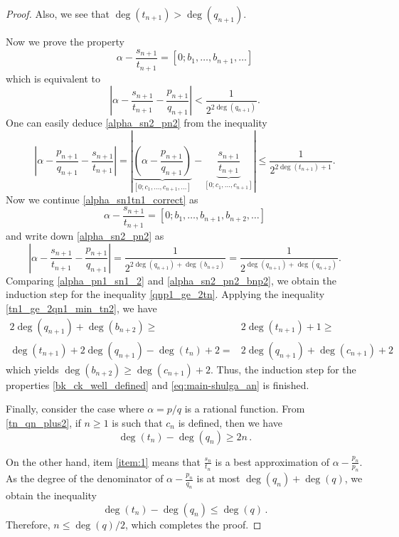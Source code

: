 \documentclass[a4paper,12pt]{article}
\begin{document}
\begin{proof}
{Also, we see that $\deg(t_{n+1})>\deg(q_{n+1})$.

Now we prove the property
\begin{equation}
\label{alpha_sn1tn1_correct}
\alpha-\frac{s_{n+1}}{t_{n+1}}=[0;b_1,\ldots,b_{n+1},\ldots]  
\end{equation}
which is equivalent to
\begin{equation}
\label{alpha_sn2_pn2}
\left|\alpha-\frac{s_{n+1}}{t_{n+1}}-\frac{p_{n+1}}{q_{n+1}}\right|<\frac{1}{2^{2\deg(q_{n+1})}}.
\end{equation}
One can easily deduce \eqref{alpha_sn2_pn2} from the inequality
\begin{equation}
\label{alpha_pn1_sn1_2}
\left|\alpha-\frac{p_{n+1}}{q_{n+1}}-\frac{s_{n+1}}{t_{n+1}}\right|=
\left|\underbrace{\left(\alpha-\frac{p_{n+1}}{q_{n+1}}\right)}_{[0;c_1,\ldots,c_{n+1},\ldots]}-\underbrace{\frac{s_{n+1}}{t_{n+1}}}_{[0;c_1,\ldots,c_{n+1}]}\right|\le\frac{1}{2^{2\deg(t_{n+1})+1}}.
\end{equation}
Now we continue \eqref{alpha_sn1tn1_correct} as 
\begin{equation}
\label{alpha_sn1tn1_correct_2}
\alpha-\frac{s_{n+1}}{t_{n+1}}=[0;b_1,\ldots,b_{n+1},b_{n+2},\ldots]  
\end{equation}
and write down \eqref{alpha_sn2_pn2} as 
\begin{equation}
\label{alpha_sn2_pn2_bnp2}
\left|\alpha-\frac{s_{n+1}}{t_{n+1}}-\frac{p_{n+1}}{q_{n+1}}\right|=\frac{1}{2^{2\deg(q_{n+1})+\deg(b_{n+2})}}=\frac{1}{2^{\deg(q_{n+1})+\deg(q_{n+2})}}. 
\end{equation}
Comparing \eqref{alpha_pn1_sn1_2} and \eqref{alpha_sn2_pn2_bnp2}, we obtain the induction step for the inequality \eqref{qnp1_ge_2tn}. 
Applying the inequality \eqref{tn1_ge_2qn1_min_tn2}, we have
\begin{align*}
2\deg(q_{n+1})+\deg(b_{n+2})\ge& 2\deg(t_{n+1})+1\ge\\ \deg(t_{n+1})+2\deg(q_{n+1})-\deg(t_n)+2=&2\deg(q_{n+1})+\deg(c_{n+1})+2
\end{align*}
which yields $\deg(b_{n+2})\ge\deg(c_{n+1})+2$. Thus, the induction step for the properties \eqref{bk_ck_well_defined} and \eqref{eq:main-shulga_an} is finished.}

Finally, consider the case where $\alpha=p/q$ is a rational function.
From \eqref{tn_qn_plus2}, if $n\geq1$ is such that $c_n$ is defined, then we have 
\begin{equation*}
\deg(t_n)-\deg(q_n)\geq 2n\,.
\end{equation*}

On the other hand, item \ref{item:1} means that $\frac{s_n}{t_n}$ is a best approximation of $\alpha-\frac{p_n}{p_n}$. As the degree of the denominator of $\alpha-\frac{p_n}{q_n}$ is at most $\deg(q_n)+\deg(q)$, we obtain the inequality  
\begin{equation*}
\deg(t_n)-\deg(q_n)\leq\deg(q)\,.
\end{equation*}
Therefore, $n\leq \deg(q)/2$, which completes the proof.
\end{proof}
\end{document}
